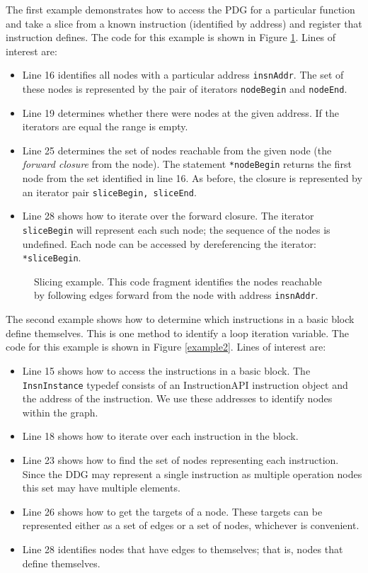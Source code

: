 \documentclass[12pt,titlepage]{article}
\begin{document}
The first example demonstrates how to access the PDG for a particular
function and take a slice from a known instruction (identified by
address) and register that instruction defines. The code for this
example is shown in Figure \ref{example1}. Lines of interest are:
\begin{itemize}
\item Line 16 identifies all nodes with a particular address
  \texttt{insnAddr}. The set of these nodes is represented by the pair
  of iterators \texttt{nodeBegin} and \texttt{nodeEnd}.
\item Line 19 determines whether there were nodes at the given
  address. If the iterators are equal the range is empty.
\item Line 25 determines the set of nodes reachable from the given
  node (the \emph{forward closure} from the node). The statement
  \texttt{*nodeBegin} returns the first node from the set identified
  in line 16. As before, the closure is represented by an iterator
  pair \texttt{sliceBegin, sliceEnd}. 
\item Line 28 shows how to iterate over the forward closure. The
  iterator \texttt{sliceBegin} will represent each such node; the
  sequence of the nodes is undefined. Each node can be accessed by
  dereferencing the iterator: \texttt{*sliceBegin}.
\end{itemize}

\begin{figure}\label{example1}

\caption{Slicing example. This code fragment identifies the nodes
  reachable by following edges forward from the node with address
  \texttt{insnAddr}.}
\end{figure}


The second example shows how to determine which instructions in a
basic block define themselves. This is one method to identify a loop
iteration variable. The code for this example is shown in Figure
\ref{example2}. Lines of interest are:
\begin{itemize}
\item Line 15 shows how to access the instructions in a basic
  block. The \texttt{InsnInstance} typedef consists of an
  InstructionAPI instruction object and the address of the
  instruction. We use these addresses to identify nodes within the
  graph.
\item Line 18 shows how to iterate over each instruction in the block.
\item Line 23 shows how to find the set of nodes representing each
  instruction. Since the DDG may represent a single instruction as
  multiple operation nodes this set may have multiple elements. 
\item Line 26 shows how to get the targets of a node. These targets
  can be represented either as a set of edges or a set of nodes,
  whichever is convenient. 
\item Line 28 identifies nodes that have edges to themselves; that is,
  nodes that define themselves. 
\end{itemize}
\end{document}
